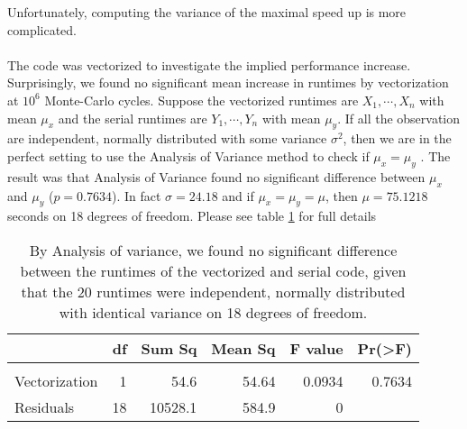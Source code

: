 \documentclass[11pt,english,a4paper]{article}
\begin{document}
Unfortunately, computing the variance of the maximal speed up is more complicated.\\
\\
The code was vectorized to investigate the implied performance increase. Surprisingly, we found no significant mean increase in runtimes by vectorization at $10^6$ Monte-Carlo cycles. Suppose the vectorized runtimes are $X_1,\cdots,X_n$ with mean $\mu_x$ and the serial runtimes are $Y_1,\cdots,Y_n$ with mean $\mu_y$. If all the observation are independent, normally distributed with some variance $\sigma^2$, then we are in the perfect setting to use the Analysis of Variance method to check if $\mu_x = \mu_y$ \parencite{devore_modern_2012}. The result was that Analysis of Variance found no significant difference between $\mu_x$ and $\mu_y$ ($p = 0.7634$). In fact $\sigma = 24.18$ and if $\mu_x = \mu_y = \mu$, then $\mu = 75.1218$ seconds on 18 degrees of freedom. Please see table \ref{tbl:anova} for full details
\begin{table}[!h]
\begin{center}
\begin{tabular}{l r r r r r}
          &df&  Sum Sq& Mean Sq& F value& Pr(>F)\\
          \hline
          \\
Vectorization    & 1&    54.6&   54.64&  0.0934& 0.7634\\
Residuals &18& 10528.1&  584.9&0
\end{tabular}
\begin{lstlisting}
\end{lstlisting}
\caption{By Analysis of variance, we found no significant difference between the runtimes of the vectorized and serial code, given that the 20 runtimes were independent, normally distributed with identical variance on 18 degrees of freedom. } \label{tbl:anova}
\end{center}
\end{table}


\end{document}
